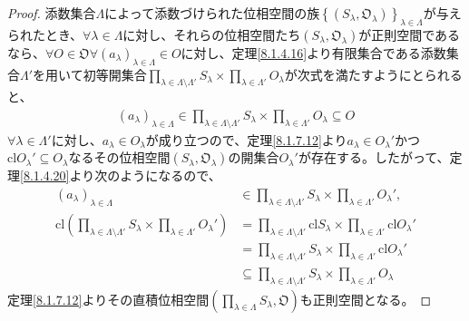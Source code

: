 \documentclass[dvipdfmx]{jsarticle}
\begin{document}
\begin{proof}
添数集合$\varLambda$によって添数づけられた位相空間の族$\left\{ \left( S_{\lambda},\mathfrak{O}_{\lambda} \right) \right\}_{\lambda \in \varLambda}$が与えられたとき、$\forall\lambda \in \varLambda$に対し、それらの位相空間たち$\left( S_{\lambda},\mathfrak{O}_{\lambda} \right)$が正則空間であるなら、$\forall O \in \mathfrak{O}\forall\left( a_{\lambda} \right)_{\lambda \in \varLambda} \in O$に対し、定理\ref{8.1.4.16}より有限集合である添数集合$\varLambda'$を用いて初等開集合$\prod_{\lambda \in \varLambda \setminus \varLambda'} S_{\lambda} \times \prod_{\lambda \in \varLambda'} O_{\lambda}$が次式を満たすようにとられると、
\begin{align*}
\left( a_{\lambda} \right)_{\lambda \in \varLambda} \in \prod_{\lambda \in \varLambda \setminus \varLambda'} S_{\lambda} \times \prod_{\lambda \in \varLambda'} O_{\lambda} \subseteq O
\end{align*}
$\forall\lambda \in \varLambda'$に対し、$a_{\lambda} \in O_{\lambda}$が成り立つので、定理\ref{8.1.7.12}より$a_{\lambda} \in O_{\lambda}'$かつ${\mathrm{cl}}O_{\lambda}' \subseteq O_{\lambda}$なるその位相空間$\left( S_{\lambda},\mathfrak{O}_{\lambda} \right)$の開集合$O_{\lambda}'$が存在する。したがって、定理\ref{8.1.4.20}より次のようになるので、
\begin{align*}
\left( a_{\lambda} \right)_{\lambda \in \varLambda} &\in \prod_{\lambda \in \varLambda \setminus \varLambda'} S_{\lambda} \times \prod_{\lambda \in \varLambda'} O_{\lambda}',\\
{\mathrm{cl}}\left( \prod_{\lambda \in \varLambda \setminus \varLambda'} S_{\lambda} \times \prod_{\lambda \in \varLambda'} O_{\lambda}' \right) &= \prod_{\lambda \in \varLambda \setminus \varLambda'} {{\mathrm{cl}}S_{\lambda}} \times \prod_{\lambda \in \varLambda'} {{\mathrm{cl}}O_{\lambda}'}\\
&= \prod_{\lambda \in \varLambda \setminus \varLambda'} S_{\lambda} \times \prod_{\lambda \in \varLambda'} {{\mathrm{cl}}O_{\lambda}'}\\
&\subseteq \prod_{\lambda \in \varLambda \setminus \varLambda'} S_{\lambda} \times \prod_{\lambda \in \varLambda'} O_{\lambda}
\end{align*}
定理\ref{8.1.7.12}よりその直積位相空間$\left( \prod_{\lambda \in \varLambda} S_{\lambda},\mathfrak{O} \right)$も正則空間となる。\par

\end{proof}
\end{document}
